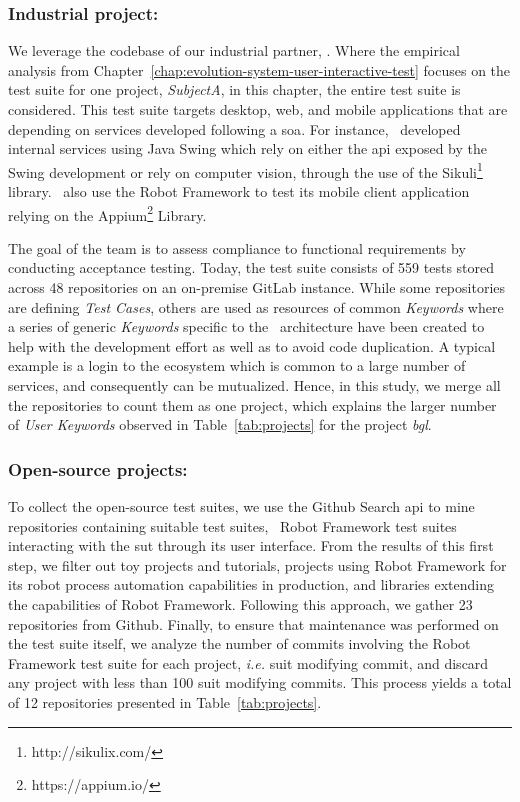 \subsubsection{Industrial project:}
We leverage the codebase of our industrial partner, \BGL. Where the empirical analysis from Chapter~\ref{chap:evolution-system-user-interactive-test} focuses on the test suite for one project, \emph{SubjectA}, in this chapter, the entire test suite is considered. This test suite targets desktop, web, and mobile applications that are depending on services developed following a \gls{soa}. For instance, \BGL\ developed internal services using Java Swing which rely on either the \gls{api} exposed by the Swing development or rely on computer vision, through the use of the Sikuli\footnote{http://sikulix.com/} library. \BGL\ also use the Robot Framework to test its mobile client application relying on the Appium\footnote{https://appium.io/} Library.

The goal of the team is to assess compliance to functional requirements by conducting acceptance testing. Today, the test suite consists of 559 tests stored across 48 repositories on an on-premise GitLab instance. While some repositories are defining \emph{Test Cases}, others are used as resources of common \emph{Keywords} where a series of generic \emph{Keywords} specific to the \BGL\ architecture have been created to help with the development effort as well as to avoid code duplication. A typical example is a login to the ecosystem which is common to a large number of services, and consequently can be mutualized. Hence, in this study, we merge all the repositories to count them as one project, which explains the larger number of \emph{User Keywords} observed in Table~\ref{tab:projects} for the project \emph{bgl}.

\subsubsection{Open-source projects:} 
To collect the open-source test suites, we use the Github Search \gls{api} to mine repositories containing suitable test suites, \ie\ Robot Framework test suites interacting with the \gls{sut} through its user interface. From the results of this first step, we filter out toy projects and tutorials, projects using Robot Framework for its robot process automation capabilities in production, and libraries extending the capabilities of Robot Framework. Following this approach, we gather 23 repositories from Github. Finally, to ensure that maintenance was performed on the test suite itself, we analyze the number of commits involving the Robot Framework test suite for each project, \emph{i.e.} \gls{suit} modifying commit, and discard any project with less than 100 \gls{suit} modifying commits. This process yields a total of 12 repositories presented in Table~\ref{tab:projects}.


